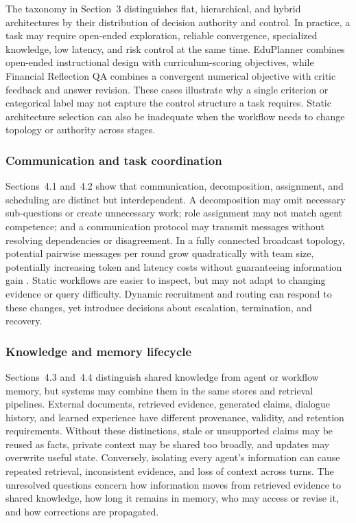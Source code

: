 \documentclass[a4paper,fleqn]{cas-dc}
\begin{document}
The taxonomy in Section~3 distinguishes flat, hierarchical, and hybrid
architectures by their distribution of decision authority and control. In
practice, a task may require open-ended exploration, reliable convergence,
specialized knowledge, low latency, and risk control at the same time.
EduPlanner \citep{zhang2024eduplanner} combines open-ended instructional
design with curriculum-scoring objectives, while Financial Reflection QA
\citep{fatemi2024financialqa} combines a convergent numerical objective with
critic feedback and answer revision. These cases illustrate why a single
criterion or categorical label may not capture the control structure a task
requires. Static architecture selection can also be inadequate when the
workflow needs to change topology or authority across stages.

\subsubsection{Communication and task coordination}
\label{sec:coordination_challenges}

Sections~4.1 and~4.2 show that communication, decomposition, assignment, and
scheduling are distinct but interdependent. A decomposition may omit necessary
sub-questions or create unnecessary work; role assignment may not match agent
competence; and a communication protocol may transmit messages without
resolving dependencies or disagreement. In a fully connected broadcast
topology, potential pairwise messages per round grow quadratically with team
size, potentially increasing token and latency costs without guaranteeing information gain
\citep{qian2024scaling_multiagent}. Static workflows are easier to inspect,
but may not adapt to changing evidence or query difficulty. Dynamic
recruitment and routing can respond to these changes, yet introduce decisions
about escalation, termination, and recovery.

\subsubsection{Knowledge and memory lifecycle}
\label{sec:knowledge_memory_challenges}

Sections~4.3 and~4.4 distinguish shared knowledge from agent or workflow
memory, but systems may combine them in the same stores and retrieval
pipelines. External documents, retrieved evidence, generated claims, dialogue
history, and learned experience have different provenance, validity, and
retention requirements. Without these distinctions, stale or unsupported
claims may be reused as facts, private context may be shared too broadly, and
updates may overwrite useful state. Conversely, isolating every agent's
information can cause repeated retrieval, inconsistent evidence, and loss of
context across turns. The unresolved questions concern how information moves
from retrieved evidence to shared knowledge, how long it remains in memory,
who may access or revise it, and how corrections are propagated.
\end{document}
